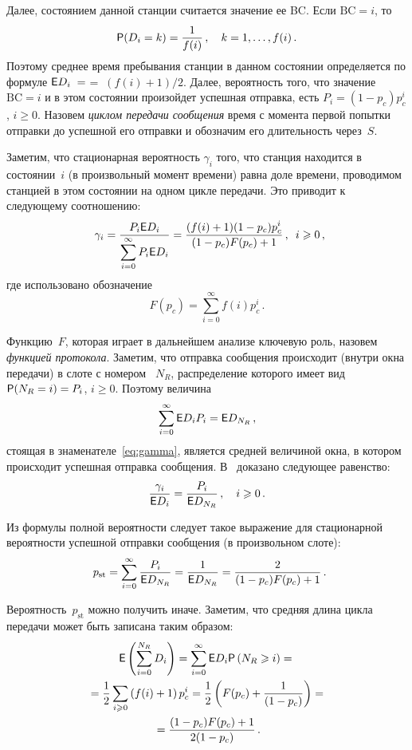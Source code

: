 \begin{multicols}{2}
Далее, состоянием данной станции считается  значение ее  BC. Если
$\mathrm{BC}=i$, то
$$
{\sf P} (D_i=k)=\displaystyle\frac{\displaystyle 1\mathstrut}{\displaystyle f(i)\mathstrut}\,,\quad k=1,\dots,f(i)\,.
$$
Поэтому  среднее  время пребывания станции в данном состоянии определяется по формуле
${\sf E} D_i\;=$\linebreak $=\;(f(i)+1)/2$. Далее, вероятность того, что значение $\mathrm{BC}=i$ и
в этом состоянии произойдет успешная отправка, есть
$P_i=(1-p_c)p_c^i$, $i\ge 0$. Назовем {\it циклом передачи
сообщения} время с момента первой попытки отправки до
успешной  его отправки и обозначим его длительность через~$S$.

Заметим, что стационарная вероятность $\gamma_i$ того, что станция
находится в состоянии~$i$ (в произвольный момент времени) равна доле
времени, проводимом станцией в этом состоянии на одном  цикле
передачи. Это приводит к сле\-ду\-юще\-му соотношению:
\begin{equation}
\gamma_i =
   \displaystyle\frac{\displaystyle P_i  {\sf E} D_i \mathstrut}{\displaystyle \sum_{i=0}^{\infty} P_i  {\sf E} D_i\mathstrut}
    =
   \displaystyle\frac{\displaystyle (f(i)+1)(1-p_c)p_c^i\mathstrut}{\displaystyle (1-p_c)F(p_c)+1\mathstrut}\,, \enskip i\geqslant 0\,,\!\!\!
         \label{eq:gamma}
\end{equation}
где использовано обозначение
\begin{equation*}
    F(p_c)
    =
    \sum_{i=0}^{\infty}f(i)p_c^i\,.
\end{equation*}

 Функцию~$F$, которая   играет в дальнейшем анализе ключевую роль,
 назовем {\it функцией протокола}. Заметим, что отправка сообщения
происходит (внутри окна передачи) в слоте с номером~ $N_R$,
распределение которого имеет вид $ {\sf P}(N_R=i)=P_i$, $i\ge 0.$ Поэтому величина
$$
\sum_{i=0}^{\infty} {\sf E} D_i P_i={\sf E} D_{N_R}\,,
$$
стоящая в знаменателе~\eqref{eq:gamma}, является  средней  величиной
окна, в котором происходит успешная отправка  сообщения. В~\cite{KWAK} доказано следующее равенство:
$$
\displaystyle\frac{\displaystyle \gamma_i\mathstrut}{\displaystyle {\sf E} D_i\mathstrut}=
   \displaystyle\frac{\displaystyle  P_i\mathstrut}{\displaystyle {\sf E} D_{N_R}\mathstrut}\,,\quad i\geqslant 0\,.
$$

Из формулы полной вероятности следует   такое выражение для
стационарной вероятности успешной отправки сообщения (в
произвольном слоте):
\begin{equation}
p_{\mathrm{st}} = \sum_{i=0}^{\infty}
   \displaystyle\frac{\displaystyle P_i\mathstrut}{\displaystyle {\sf E}
D_{N_R}\mathstrut}=\displaystyle\frac{\displaystyle 1\mathstrut}{\displaystyle {\sf E} D_{N_R}\mathstrut}
   = \displaystyle\frac{\displaystyle 2\mathstrut}{\displaystyle (1-p_c)F(p_c)+1\mathstrut}\,.\!\!\!
   \label{eq:pt}
\end{equation}

Вероятность~$p_{\mathrm{st}}$ можно получить  иначе. Заметим, что средняя
длина цикла передачи может быть записана таким образом:
\begin{multline}
{\sf E}\left(\sum_{i=0}^{N_R}D_i\right)=\sum_{i=0}^\infty {\sf E} D_i
{\sf P}\left(N_R\geqslant i\right)={}\\
{}=\displaystyle\frac{\displaystyle 1\mathstrut}{\displaystyle 2\mathstrut}\sum_{i\geqslant 0}\left(f(i)+1\right)p_c^i=\displaystyle\frac{\displaystyle 1\mathstrut}{\displaystyle 2\mathstrut} \left(F(p_c)+\displaystyle\frac{\displaystyle 1\mathstrut}{\displaystyle (1-p_c)\mathstrut}\right)={}\\
{}=
\displaystyle\frac{\displaystyle (1-p_c)F(p_c)+1\mathstrut}{\displaystyle 2(1-p_c)\mathstrut}\,.
\label{eq:4}
\end{multline}


\end{multicols}
